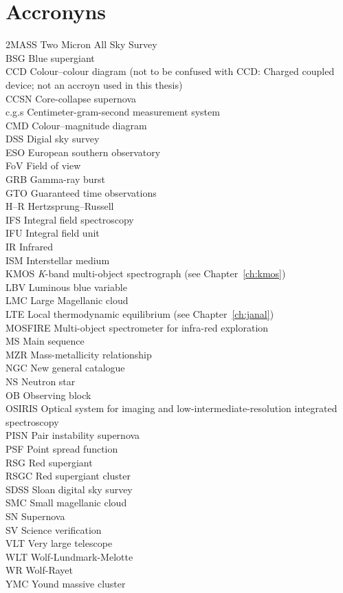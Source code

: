 \chapter{Accronyns}\label{ch:acc}
2MASS Two Micron All Sky Survey\\
BSG Blue supergiant\\
CCD Colour--colour diagram (not to be confused with CCD: Charged coupled device; not an accroyn used in this thesis)\\
CCSN Core-collapse supernova\\
c.g.s Centimeter-gram-second measurement system\\
CMD Colour--magnitude diagram\\
DSS Digial sky survey\\
ESO European southern observatory\\
FoV Field of view\\
GRB Gamma-ray burst\\
GTO Guaranteed time observations\\
H--R Hertzsprung--Russell\\
IFS Integral field spectroscopy\\
IFU Integral field unit\\
IR Infrared\\
ISM Interstellar medium\\
KMOS {\it K}-band multi-object spectrograph (see Chapter~\ref{ch:kmos})\\
LBV Luminous blue variable\\
LMC Large Magellanic cloud\\
LTE Local thermodynamic equilibrium (see Chapter~\ref{ch:janal})\\
MOSFIRE Multi-object spectrometer for infra-red exploration\\
MS Main sequence\\
MZR Mass-metallicity relationship\\
NGC New general catalogue\\
NS Neutron star\\
OB Observing block\\
OSIRIS Optical system for imaging and low-intermediate-resolution integrated spectroscopy\\
PISN Pair instability supernova\\
PSF Point spread function\\
RSG Red supergiant\\
RSGC Red supergiant cluster\\
SDSS Sloan digital sky survey\\
SMC Small magellanic cloud\\
SN Supernova\\
SV Science verification\\
VLT Very large telescope\\
WLT Wolf-Lundmark-Melotte\\
WR Wolf-Rayet\\
YMC Yound massive cluster\\
